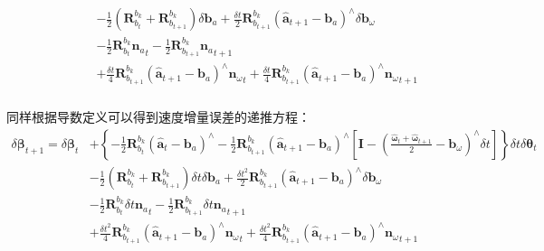 \begin{enumerate}
\begin{equation}
\begin{aligned}
		&\qquad\begin{aligned}
			&-\frac{1}{2}\left(\bm{R}_{b_t}^{b_k}+\bm{R}_{b_{t+1}}^{b_k}\right)\delta\bm{b}_a+\frac{\delta t}{2}\bm{R}_{b_{t+1}}^{b_k}\left(\hat{\bm{a}}_{t+1}-\bm{b}_a\right)^\wedge\delta\bm{b}_\omega\\
			&-\frac{1}{2}\bm{R}_{b_t}^{b_k}{\bm{n}_a}_t-\frac{1}{2}\bm{R}_{b_{t+1}}^{b_k}{\bm{n}_a}_{t+1}\\
			&+\frac{\delta t}{4}\bm{R}_{b_{t+1}}^{b_k}\left(\hat{\bm{a}}_{t+1}-\bm{b}_a\right)^\wedge{\bm{n}_\omega}_t+\frac{\delta t}{4}\bm{R}_{b_{t+1}}^{b_k}\left(\hat{\bm{a}}_{t+1}-\bm{b}_a\right)^\wedge{\bm{n}_\omega}_{t+1}\\
		\end{aligned}
	\end{aligned}
	\end{equation}
	
	同样根据导数定义可以得到速度增量误差的递推方程：
	\begin{equation}
	\begin{aligned}
		\delta\bm{\beta}_{t+1}=\delta\bm{\beta}_t&+\left\{-\frac{1}{2}\bm{R}_{b_t}^{b_k}\left(\hat{\bm{a}}_t-\bm{b}_a\right)^\wedge-\frac{1}{2}\bm{R}_{b_{t+1}}^{b_k}\left(\hat{\bm{a}}_{t+1}-\bm{b}_a\right)^\wedge\left[\bm{I}-\left(\frac{\hat{\bm{\omega}}_t+\hat{\bm{\omega}}_{t+1}}{2}-\bm{b}_\omega\right)^\wedge\delta t\right]\right\}\delta t\delta\bm{\theta}_t\\
		&-\frac{1}{2}\left(\bm{R}_{b_t}^{b_k}+\bm{R}_{b_{t+1}}^{b_k}\right)\delta t\delta\bm{b}_a+\frac{\delta t^2}{2}\bm{R}_{b_{t+1}}^{b_k}\left(\hat{\bm{a}}_{t+1}-\bm{b}_a\right)^\wedge\delta\bm{b}_\omega\\
		&-\frac{1}{2}\bm{R}_{b_t}^{b_k}\delta t{\bm{n}_a}_t-\frac{1}{2}\bm{R}_{b_{t+1}}^{b_k}\delta t{\bm{n}_a}_{t+1}\\
		&+\frac{\delta t^2}{4}\bm{R}_{b_{t+1}}^{b_k}\left(\hat{\bm{a}}_{t+1}-\bm{b}_a\right)^\wedge{\bm{n}_\omega}_t+\frac{\delta t^2}{4}\bm{R}_{b_{t+1}}^{b_k}\left(\hat{\bm{a}}_{t+1}-\bm{b}_a\right)^\wedge{\bm{n}_\omega}_{t+1}\\
	\end{aligned}
	\end{equation}
	

\end{enumerate}
